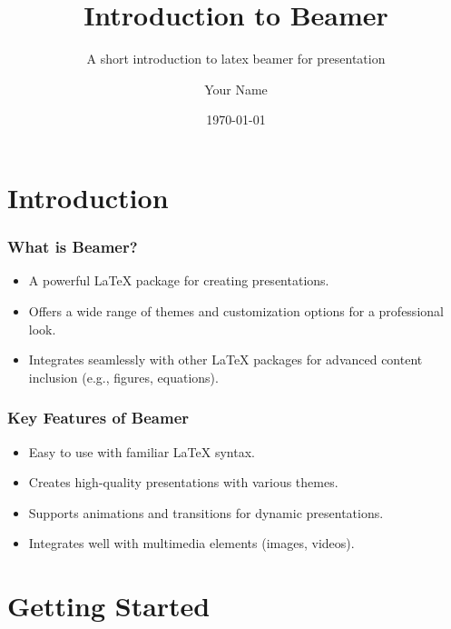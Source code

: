 
\title{Introduction to Beamer}
\subtitle{A short introduction to latex beamer for presentation}
\author{Your Name}
\date{\today}



\maketitle

\section{Introduction}
\begin{frame}
    \sectionpage
\end{frame}

{
\usebackgroundtemplate{\backgroundcontent}
\begin{frame}
  \frametitle{What is Beamer?}
  \begin{itemize}
    \item A powerful LaTeX package for creating presentations.
    \item Offers a wide range of themes and customization options for a professional look.
    \item Integrates seamlessly with other LaTeX packages for advanced content inclusion (e.g., figures, equations).
  \end{itemize}
\end{frame}
}

{
\usebackgroundtemplate{\backgroundcontent}
\begin{frame}
  \frametitle{Key Features of Beamer}
    \begin{itemize}
      \item Easy to use with familiar LaTeX syntax.
      \item Creates high-quality presentations with various themes.
      \item Supports animations and transitions for dynamic presentations.
      \item Integrates well with multimedia elements (images, videos).
  \end{itemize}
\end{frame}
}

\section{Getting Started}
\begin{frame}
    \sectionpage
\end{frame}

